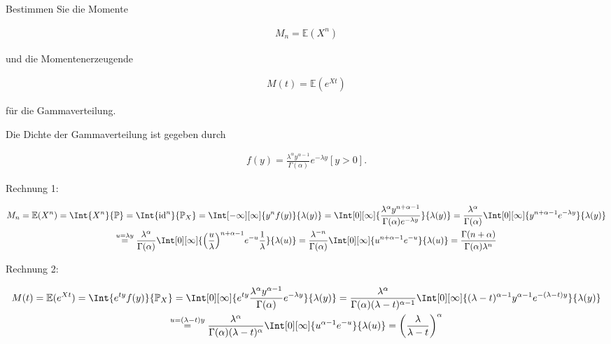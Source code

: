 \begin{exercise}

Bestimmen Sie die Momente

\begin{align*}
  M_n = \mathbb{E}(X^n)
\end{align*}

und die Momentenerzeugende

\begin{align*}
  M(t) = \mathbb{E}(e^{Xt})
\end{align*}

für die Gammaverteilung.

\end{exercise}

\begin{solution}

Die Dichte der Gammaverteilung ist gegeben durch

\begin{align*}
  f(y) =
  \frac
  {
    \lambda^\alpha
    y^{\alpha - 1}
  }{
    \Gamma(\alpha)
  }
  e^{-\lambda y}
  [y > 0].
\end{align*}

Rechnung 1:

\begin{multline*}
  M_n
  = \E(X^n)
  = \Int{X^n}{\P}
  = \Int{\id^n}{\P_X}
  = \Int[-\infty][\infty]{y^n f(y)}{\lambda(y)}
  = \Int[0][\infty]
  {
    \frac
    {\lambda^\alpha y^{n + \alpha - 1}}
    {
      \Gamma(\alpha)
      e^{-\lambda y}
    }
  }{\lambda(y)}
  = \frac
    {\lambda^\alpha}
    {\Gamma(\alpha)}
    \Int[0][\infty]
    {
      y^{n + \alpha - 1}
      e^{-\lambda y}
    }
    {\lambda(y)} \\
  \stackrel{u = \lambda y}{=}
    \frac
    {\lambda^\alpha}
    {\Gamma(\alpha)}
    \Int[0][\infty]
    {
      \pbraces{\frac{u}{\lambda}}^{n + \alpha - 1}
      e^{-u}
      \frac{1}{\lambda}
    }
    {\lambda(u)}
  = \frac{\lambda^{-n}}{\Gamma(\alpha)}
    \Int[0][\infty]{u^{n + \alpha - 1} e^{-u}}{\lambda(u)}
  = \frac
    {\Gamma(n + \alpha)}
    {\Gamma(\alpha)\lambda^n}
\end{multline*}

Rechnung 2:

\begin{multline*}
  M(t)
  = \E(e^{Xt})
  = \Int{e^{ty} f(y)}{\P_X}
  = \Int[0][\infty]
    {
      e^{ty}
      \frac
      {\lambda^\alpha y^{\alpha -1}}
      {\Gamma(\alpha)}
      e^{-\lambda y}
    }
    {\lambda(y)}
  = \frac
    {\lambda^\alpha}
    {
      \Gamma(\alpha)
      (\lambda - t)^{\alpha - 1}
    }
    \Int[0][\infty]
    {
      (\lambda - t)^{\alpha - 1}
      y^{\alpha - 1}
      e^{-(\lambda - t) y}
    }
    {\lambda(y)} \\
  \stackrel{u = (\lambda - t) y}{=}
    \frac
    {\lambda^\alpha}
    {
      \Gamma(\alpha)
      (\lambda - t)^\alpha
    }
    \Int[0][\infty]
    {
      u^{\alpha - 1}
      e^{-u}
    }
    {\lambda(u)}
  = \pbraces
    {
      \frac
      {\lambda}
      {\lambda-t}
    }^\alpha
\end{multline*}

\end{solution}

